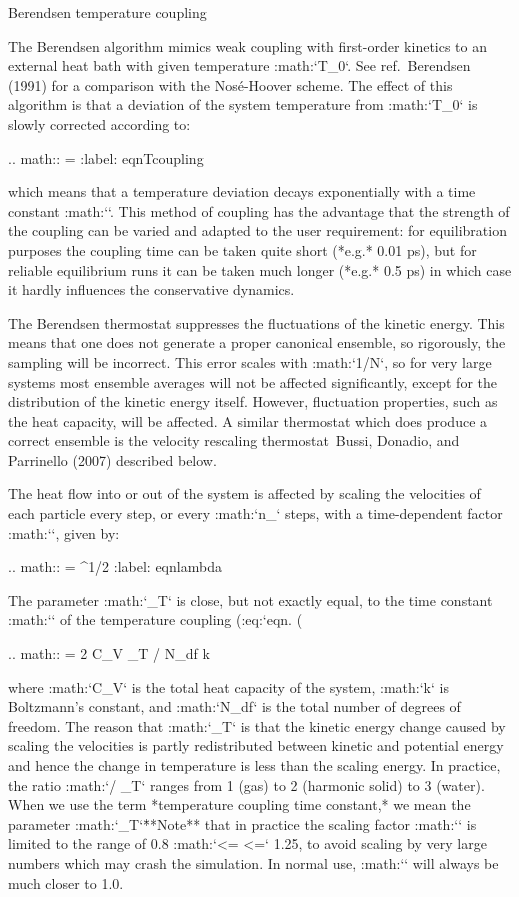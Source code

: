 Berendsen temperature coupling
^^^^^^^^^^^^^^^^^^^^^^^^^^^^^^

The Berendsen algorithm mimics weak coupling with first-order kinetics
to an external heat bath with given temperature :math:`T_0`. See
ref. Berendsen (1991) for a comparison with the Nosé-Hoover scheme. The
effect of this algorithm is that a deviation of the system temperature
from :math:`T_0` is slowly corrected according to:

.. math::   = 
           :label: eqnTcoupling

which means that a temperature deviation decays exponentially with a
time constant :math:`\tau`. This method of coupling has the advantage
that the strength of the coupling can be varied and adapted to the user
requirement: for equilibration purposes the coupling time can be taken
quite short (*e.g.* 0.01 ps), but for reliable equilibrium runs it can
be taken much longer (*e.g.* 0.5 ps) in which case it hardly influences
the conservative dynamics.

The Berendsen thermostat suppresses the fluctuations of the kinetic
energy. This means that one does not generate a proper canonical
ensemble, so rigorously, the sampling will be incorrect. This error
scales with :math:`1/N`, so for very large systems most ensemble
averages will not be affected significantly, except for the distribution
of the kinetic energy itself. However, fluctuation properties, such as
the heat capacity, will be affected. A similar thermostat which does
produce a correct ensemble is the velocity rescaling thermostat Bussi,
Donadio, and Parrinello (2007) described below.

The heat flow into or out of the system is affected by scaling the
velocities of each particle every step, or every :math:`n_`
steps, with a time-dependent factor :math:`\lambda`, given by:

.. math::  \lambda = ^{1/2}
           :label: eqnlambda

The parameter :math:`\tau_T` is close, but not exactly equal, to the
time constant :math:`\tau` of the temperature coupling
(:eq:`eqn. (%

.. math:: \tau = 2 C_V \tau_T / N_{df} k

where :math:`C_V` is the total heat capacity of the system, :math:`k`
is Boltzmann’s constant, and :math:`N_{df}` is the total number of
degrees of freedom. The reason that :math:`\tau \neq \tau_T` is that the
kinetic energy change caused by scaling the velocities is partly
redistributed between kinetic and potential energy and hence the change
in temperature is less than the scaling energy. In practice, the ratio
:math:`\tau / \tau_T` ranges from 1 (gas) to 2 (harmonic solid) to 3
(water). When we use the term *temperature coupling time constant,* we
mean the parameter :math:`\tau_T`\.
**Note** that in practice the scaling factor :math:`\lambda` is limited
to the range of 0.8 :math:`<= \lambda <=` 1.25, to avoid scaling by very
large numbers which may crash the simulation. In normal use,
:math:`\lambda` will always be much closer to 1.0.

